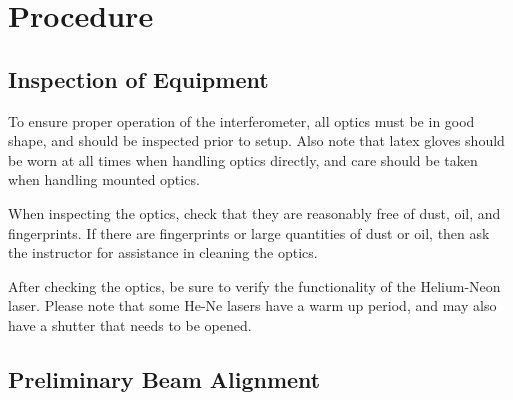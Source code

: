\section{Procedure}
\label{sec:procedure}

\subsection{Inspection of Equipment}
\label{sub:inspection}

To ensure proper operation of the interferometer, all optics must be in good
shape, and should be inspected prior to setup. Also note that latex gloves
should be worn at all times when handling optics directly, and care should be
taken when handling mounted optics.

When inspecting the optics, check that they are reasonably free of dust, oil,
and fingerprints. If there are fingerprints or large quantities of dust or oil,
then ask the instructor for assistance in cleaning the optics.

After checking the optics, be sure to verify the functionality of the
Helium-Neon laser. Please note that some He-Ne lasers have a warm up period, and
may also have a shutter that needs to be opened.

\subsection{Preliminary Beam Alignment}
\label{sub:preliminary}


